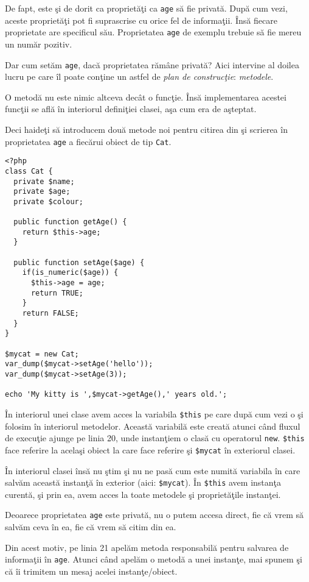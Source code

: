 De fapt, este şi de dorit ca proprietăţi ca \texttt{age} să fie privată. După cum vezi,
aceste proprietăţi pot fi suprascrise cu orice fel de informaţii. Însă fiecare proprietate
are specificul său. Proprietatea \texttt{age} de exemplu trebuie să fie mereu un număr pozitiv.

Dar cum setăm \texttt{age}, dacă proprietatea rămâne privată? Aici intervine al doilea lucru
pe care îl poate conţine un astfel de \textit{plan de construcţie}: \textsl{metodele}.

O metodă nu este nimic altceva decât o funcţie. Însă implementarea acestei funcţii se află
în interiorul definiţiei clasei, aşa cum era de aşteptat.

Deci haideţi să introducem două metode noi pentru citirea din şi scrierea în proprietatea
\texttt{age} a fiecărui obiect de tip \texttt{Cat}.

\begin{lstlisting}[title=Getters and Setters]
<?php
class Cat {
  private $name;
  private $age;
  private $colour;

  public function getAge() {
    return $this->age;
  }

  public function setAge($age) {
    if(is_numeric($age)) {
      $this->age = age;
      return TRUE;
    }
    return FALSE;
  }
}

$mycat = new Cat;
var_dump($mycat->setAge('hello'));
var_dump($mycat->setAge(3));

echo 'My kitty is ',$mycat->getAge(),' years old.';
\end{lstlisting}

În interiorul unei clase avem acces la variabila \texttt{\$this} pe care
după cum vezi o şi folosim în interiorul metodelor. Această variabilă
este creată atunci când fluxul de execuţie ajunge pe linia 20, unde instanţiem
o clasă cu operatorul \texttt{new}. \texttt{\$this} face referire la acelaşi obiect la care face
referire şi \texttt{\$mycat} în exteriorul clasei.

În interiorul clasei însă nu ştim şi nu ne pasă cum este numită variabila
în care salvăm această instanţă în exterior (aici: \texttt{\$mycat}).
În \texttt{\$this} avem instanţa curentă,
şi prin ea, avem acces la toate metodele şi proprietăţile instanţei.

Deoarece proprietatea \texttt{age} este privată, nu o putem accesa direct,
fie că vrem să salvăm ceva în ea, fie că vrem să citim din ea.

Din acest motiv, pe linia 21 apelăm metoda responsabilă pentru salvarea
de informaţii în \texttt{age}. Atunci când apelăm o metodă a unei instanţe,
mai spunem şi că îi trimitem un mesaj acelei instanţe/obiect.

